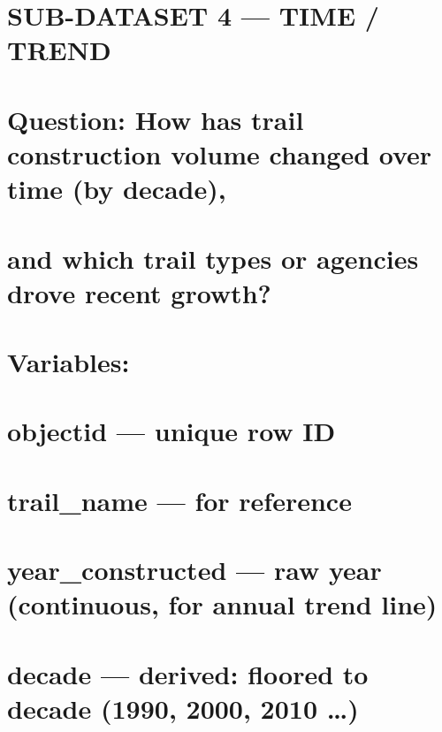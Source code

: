 \documentclass[
]{article}
\begin{document}
\section{SUB-DATASET 4 --- TIME / TREND}\label{sub-dataset-4-time-trend}

\section{Question: How has trail construction volume changed over time
(by
decade),}\label{question-how-has-trail-construction-volume-changed-over-time-by-decade}

\section{and which trail types or agencies drove recent
growth?}\label{and-which-trail-types-or-agencies-drove-recent-growth}

\section{}\label{section-19}

\section{Variables:}\label{variables-3}

\section{objectid --- unique row ID}\label{objectid-unique-row-id-3}

\section{trail\_name --- for
reference}\label{trail_name-for-reference-2}

\section{year\_constructed --- raw year (continuous, for annual trend
line)}\label{year_constructed-raw-year-continuous-for-annual-trend-line}

\section{decade --- derived: floored to decade (1990, 2000, 2010
\ldots)}\label{decade-derived-floored-to-decade-1990-2000-2010}
\end{document}
